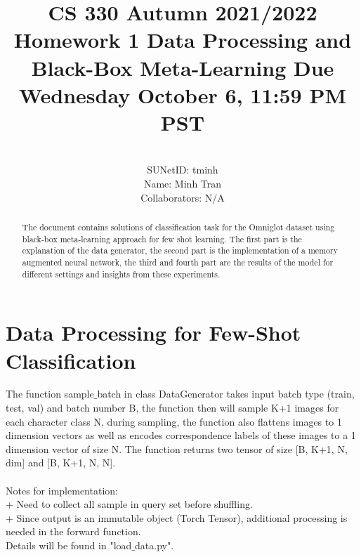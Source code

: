 \documentclass[]{article}
\title{\textbf{CS 330 Autumn 2021/2022 Homework 1}
	{Data Processing and Black-Box Meta-Learning
		Due Wednesday October 6, 11:59 PM PST}}
\author{
			\\SUNetID: tminh 
			\\Name: Minh Tran 
			\\Collaborators: N/A 
		}
\begin{document}
	
	\maketitle
	
	\begin{abstract}
		
		The document contains solutions of classification task for the Omniglot dataset using black-box meta-learning approach for few shot learning. The first part is the explanation of the data generator, the second part is the implementation of a memory augmented neural network, the third and fourth part are the results of the model for different settings and insights from these experiments. 
		
	\end{abstract}
	
	\section{Data Processing for Few-Shot Classification}
	The function sample$\_$batch in class DataGenerator takes input batch type (train, test, val) and batch number B, the function then will sample K+1 images for each character class N, during sampling, the function also flattens images to 1 dimension vectors as well as encodes correspondence labels of these images to a 1 dimension vector of size N. The function returns two tensor of size [B, K+1, N, dim] and [B, K+1, N, N]. \\
	\\
	Notes for implementation: \\
	+ Need to collect all sample in query set before shuffling.\\
	+ Since output is an immutable object (Torch Tensor), additional processing is needed in the forward function.\\
	Details will be found in "load$\_$data.py".	
	
\end{document}
